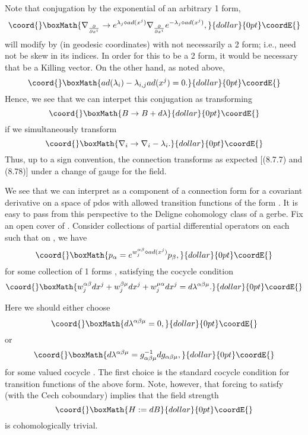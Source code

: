 \documentclass[a4paper,11pt]{amsart}
\begin{document}
Note that conjugation by the exponential of an arbitrary 1 form,
$$\coord{}\boxMath{\nabla_{\frac{\partial}{\partial x^i}}\rightarrow 
e^{\lambda_{j}\diamond ad(x^j)}\nabla_{\frac{\partial}{\partial
x^i}}e^{-\lambda_{j}\diamond ad(x^j)},}{dollar}{0pt}\coordE{}$$ 
will modify \coordHE{} by (in geodesic
coordinates)
\coordHE{} with \coordHE{} not
 necessarily a 2 form;
i.e., \coordHE{} need not be skew in its indices. In order for this to be
 a 2 form, it would be necessary that
 \coordHE{} be a Killing vector. On the other
  hand, as noted above, 
 $$\coord{}\boxMath{ad(\lambda_i) - \lambda_{i,j}ad(x^j) = 0.}{dollar}{0pt}\coordE{}$$
 Hence, we see that we can interpet this conjugation as transforming 
  $$\coord{}\boxMath{B\rightarrow B+d\lambda}{dollar}{0pt}\coordE{}$$
   if we simultaneously transform 
 $$\coord{}\boxMath{\nabla_i\rightarrow \nabla_i - \lambda_i.}{dollar}{0pt}\coordE{}$$
 Thus, up to a sign convention, the connection transforms as expected \cite{P}[(8.7.7) and (8.78)]
  under a change of gauge for the \coordHE{} field.   
 

We see that we can interpret \coordHE{} as a component of a connection form for a
 covariant derivative on a space of pdos with allowed transition functions
  of the form \coordHE{}. It is easy to pass from this 
  perspective to the Deligne cohomology class of a gerbe. 
  Fix an open cover \coordHE{} of \coordHE{}. Consider collections \coordHE{} 
   of partial differential operators on each \coordHE{} such
  that on \coordHE{}, we have 
  $$\coord{}\boxMath{p_{\alpha} = e^{w_j^{\alpha \beta}\diamond ad(x^j)}p_{\beta},}{dollar}{0pt}\coordE{}$$
  for some collection of 1 forms \coordHE{}, satisfying the
  cocycle condition 
  $$\coord{}\boxMath{w_j^{\alpha \beta} dx^j + w_j^{\beta \mu} dx^j + w_j^{\mu\alpha}
  dx^j = d\lambda^{\alpha\beta\mu}.}{dollar}{0pt}\coordE{}$$
  
  Here we should either choose 
  $$\coord{}\boxMath{d\lambda^{\alpha\beta\mu} = 0,}{dollar}{0pt}\coordE{}$$
  or 
  $$\coord{}\boxMath{d\lambda^{\alpha\beta\mu} = g_{\alpha\beta\mu}^{-1}dg_{\alpha\beta\mu},}{dollar}{0pt}\coordE{}$$
  for some \coordHE{} valued cocycle \coordHE{}.  
The first choice is the standard cocycle condition for transition functions of
the above form. Note, however, that forcing \coordHE{} to satisfy  \coordHE{} 
(with \myHighlight{$\delta$}\coordHE{} the Cech coboundary) implies that the field strength 
$$\coord{}\boxMath{H:=dB}{dollar}{0pt}\coordE{}$$ 
is cohomologically trivial. 
\end{document}
